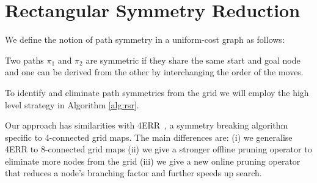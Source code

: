 \section{Rectangular Symmetry Reduction}
\label{sec:rsr}

We define the notion of path symmetry in a uniform-cost graph as follows:
\begin{definition}
\label{def:symmetry}
Two paths $\pi_{1}$ and $\pi_{2}$ are symmetric if they share the same start and
goal node and one can be derived from the other by interchanging the order of the
moves.
\end{definition}

To identify and eliminate path symmetries from the grid we will employ the high 
level strategy in Algorithm \ref{alg:rsr}.



Our approach has similarities with 4ERR~\cite{harabor10}, a symmetry breaking algorithm 
specific to 4-connected grid maps.
The main differences are: (i) we generalise 4ERR to 8-connected grid maps 
(ii) we give a stronger offline pruning operator to eliminate more nodes from
the grid (iii) we give a new online pruning operator that reduces a node's branching
factor and further speeds up search.

